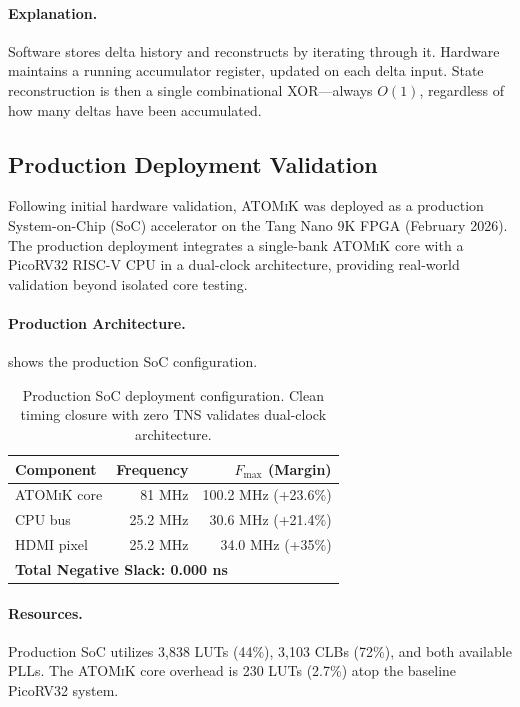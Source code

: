 \documentclass[11pt,letterpaper]{article}
\theoremstyle{plain}
\theoremstyle{definition}
\theoremstyle{remark}
\newcommand{\atomik}{\textsc{ATOMiK}}
\begin{document}
\paragraph{Explanation.} Software stores delta history and reconstructs by iterating through it. Hardware maintains a running accumulator register, updated on each delta input. State reconstruction is then a single combinational XOR---always $O(1)$, regardless of how many deltas have been accumulated.

\subsection{Production Deployment Validation}

Following initial hardware validation, \atomik{} was deployed as a production System-on-Chip (SoC) accelerator on the Tang Nano 9K FPGA (February 2026). The production deployment integrates a single-bank \atomik{} core with a PicoRV32 RISC-V CPU in a dual-clock architecture, providing real-world validation beyond isolated core testing.

\paragraph{Production Architecture.}  shows the production SoC configuration.

\begin{table}[!htbp]
\centering
\caption{Production SoC deployment configuration. Clean timing closure with zero TNS validates dual-clock architecture.}
\label{tab:production}
\begin{tabular}{@{}lrr@{}}
\toprule
\textbf{Component} & \textbf{Frequency} & \textbf{$F_{\max}$ (Margin)} \\
\midrule
\atomik{} core & 81 MHz & 100.2 MHz (+23.6\%) \\
CPU bus & 25.2 MHz & 30.6 MHz (+21.4\%) \\
HDMI pixel & 25.2 MHz & 34.0 MHz (+35\%) \\
\midrule
\multicolumn{3}{l}{\textbf{Total Negative Slack: 0.000 ns}} \\
\bottomrule
\end{tabular}
\end{table}

\paragraph{Resources.} Production SoC utilizes 3,838 LUTs (44\%), 3,103 CLBs (72\%), and both available PLLs. The \atomik{} core overhead is 230 LUTs (2.7\%) atop the baseline PicoRV32 system.
\end{document}
